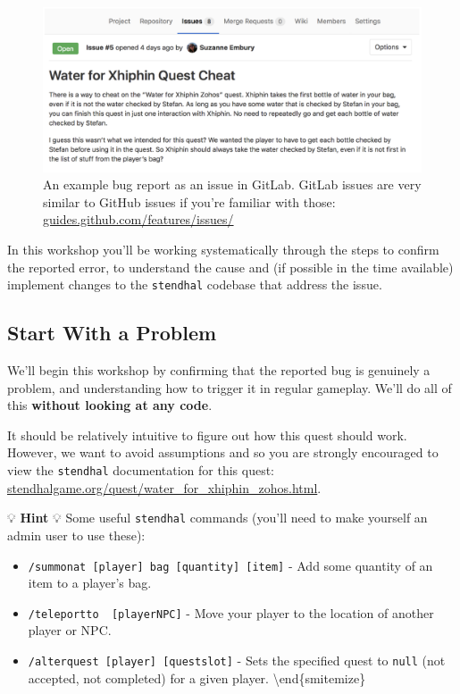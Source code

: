 \documentclass[
]{book}
\providecommand{\tightlist}{%
  \setlength{\itemsep}{0pt}\setlength{\parskip}{0pt}}
\begin{document}
\begin{figure}

{\centering \includegraphics[width=1\linewidth]{images/issue5} 

}

\caption{An example bug report as an issue in GitLab. GitLab issues are very similar to GitHub issues if you're familiar with those: \href{https://guides.github.com/features/issues/}{guides.github.com/features/issues/}}\label{fig:issue5-fig}
\end{figure}



In this workshop you'll be working systematically through the steps to confirm the reported error, to understand the cause and (if possible in the time available) implement changes to the \texttt{stendhal} codebase that address the issue.

\hypertarget{wheretostart}{%
\subsection{Start With a Problem}\label{wheretostart}}

We'll begin this workshop by confirming that the reported bug is genuinely a problem, and understanding how to trigger it in regular gameplay. We'll do all of this \textbf{without looking at any code}.

It should be relatively intuitive to figure out how this quest should work. However, we want to avoid assumptions and so you are strongly encouraged to view the \texttt{stendhal} documentation for this quest: \href{https://stendhalgame.org/quest/water_for_xhiphin_zohos.html}{stendhalgame.org/quest/water\_for\_xhiphin\_zohos.html}.

💡 \textbf{Hint} 💡
Some useful \texttt{stendhal} commands (you'll need to make yourself an admin user to use these):

\begin{itemize}
\tightlist
\item
  \texttt{/summonat\ {[}player{]}\ bag\ {[}quantity{]}\ {[}item{]}} - Add some quantity of an item to a player's bag.
\item
  \texttt{/teleportto\ \ {[}player\textbar{}NPC{]}} - Move your player to the location of another player or NPC.
\item
  \texttt{/alterquest\ {[}player{]}\ {[}questslot{]}} - Sets the specified quest to \texttt{null} (not accepted, not completed) for a given player.
  \textbackslash end\{smitemize\}
\end{itemize}
\end{document}
